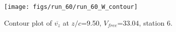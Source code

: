 \begin{figure}[H]
\centering
\texttt{[image: figs/run\_60/run\_60\_W\_contour]}
\caption{Contour plot of $\overline{v_{z}}$ at $z/c$=9.50, $V_{free}$=33.04, station 6.}
\label{fig:run_60_W_contour}
\end{figure}


